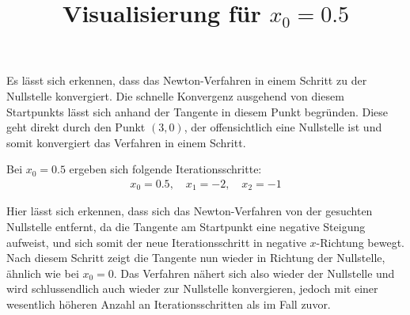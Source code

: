 \documentclass[11pt]{article}
\theoremstyle{plain}
\theoremstyle{definition}
\renewcommand{\a}{\"{a}}
\renewcommand{\o}{\"{o}}
\renewcommand{\u}{\"{u}}
\begin{document}
Es l\a sst sich erkennen, dass das Newton-Verfahren in einem Schritt zu der Nullstelle konvergiert. Die schnelle Konvergenz ausgehend von diesem Startpunkts l\a sst sich anhand der Tangente in diesem Punkt begr\u nden. Diese geht direkt durch den Punkt $(3,0)$, der offensichtlich eine Nullstelle ist und somit konvergiert das Verfahren in einem Schritt.\vspace{0.3cm}

Bei $x_0=0.5$ ergeben sich folgende Iterationsschritte:
\begin{align*}
x_0 = 0.5, \quad x_1 = -2, \quad x_2 = -1 
\end{align*}

\begin{figure}[!ht]
\centering
{}

\title{Visualisierung f\u r $x_0=0.5$}
\end{figure}

Hier l\a sst sich erkennen, dass sich das Newton-Verfahren von der gesuchten Nullstelle entfernt, da die Tangente am Startpunkt eine negative Steigung aufweist, und sich somit der neue Iterationsschritt in negative $x$-Richtung bewegt. Nach diesem Schritt zeigt die Tangente nun wieder in Richtung der Nullstelle, \a hnlich wie bei $x_0=0$. Das Verfahren n\a hert sich also wieder der Nullstelle und wird schlussendlich auch wieder zur Nullstelle konvergieren, jedoch mit einer wesentlich h\o heren Anzahl an Iterationsschritten als im Fall zuvor.\vspace{0.3cm}
\end{document}
